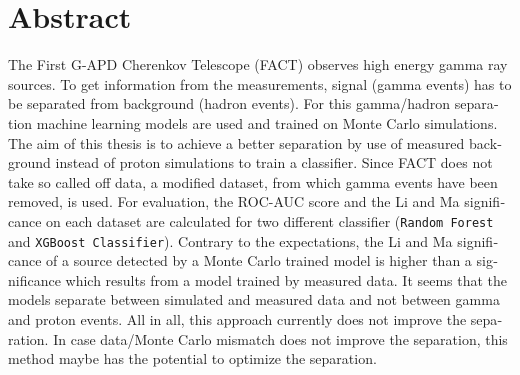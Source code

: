 \section*{Abstract}
\begin{english}
The First G-APD Cherenkov Telescope (FACT) observes high energy gamma ray sources. 
To get information from the measurements, signal (gamma events) has to be separated from background (hadron events).
For this gamma/hadron separation machine learning models are used and trained on Monte Carlo simulations.
The aim of this thesis is to achieve a better separation by use of measured background instead of proton simulations to train a classifier.
Since FACT does not take so called off data, a modified dataset, from which gamma events have been removed, is used.
For evaluation, the ROC-AUC score and the Li and Ma significance on each dataset are calculated for two different classifier (\texttt{Random Forest} and \texttt{XGBoost Classifier}).
Contrary to the expectations, the Li and Ma significance of a source detected by a Monte Carlo trained model is higher than a significance which results from a model trained by measured data.
It seems that the models separate between simulated and measured data and not between gamma and proton events.
All in all, this approach currently does not improve the separation.
In case data/Monte Carlo mismatch does not improve the separation, this method maybe has the potential to optimize the separation.
\end{english}
